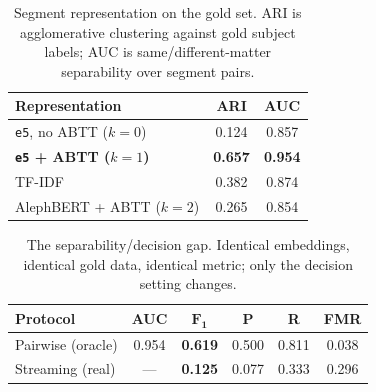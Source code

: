 \documentclass[11pt]{article}
\begin{document}
\begin{table}[t]
\centering\small
\begin{tabular}{lcc}
\hline
\textbf{Representation} & \textbf{ARI} & \textbf{AUC} \\
\hline
\texttt{e5}, no ABTT ($k{=}0$) & 0.124 & 0.857 \\
\textbf{\texttt{e5} + ABTT ($k{=}1$)} & \textbf{0.657} & \textbf{0.954} \\
TF-IDF & 0.382 & 0.874 \\
AlephBERT + ABTT ($k{=}2$) & 0.265 & 0.854 \\
\hline
\end{tabular}
\caption{Segment representation on the gold set. ARI is agglomerative clustering against
gold subject labels; AUC is same/different-matter separability over segment pairs.}
\label{tab:repr}
\end{table}

\begin{table}[t]
\centering\small\setlength{\tabcolsep}{4pt}
\begin{tabular}{lccccc}
\hline
\textbf{Protocol} & \textbf{AUC} & $\mathbf{F_1}$ & \textbf{P} & \textbf{R} & \textbf{FMR} \\
\hline
Pairwise (oracle) & 0.954 & \textbf{0.619} & 0.500 & 0.811 & 0.038 \\
Streaming (real) & --- & \textbf{0.125} & 0.077 & 0.333 & 0.296 \\
\hline
\end{tabular}
\caption{The separability/decision gap. Identical embeddings, identical gold data,
identical metric; only the decision setting changes.}
\label{tab:gap}
\end{table}
\end{document}
